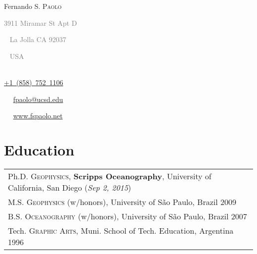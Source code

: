 \documentclass[a4paper,11pt]{article}
\newcommand*{\tbullet}{~\strut\textcolor{grey}{\LARGE\textbullet}~~}
\newcommand*{\tdash}{\strut\textcolor{grey}{\textemdash}~}
\begin{document}
\pagestyle{empty} 



\begin{center}
{\Huge 
Fernando S. \textsc{Paolo}
}\\[0.2cm]
%
\textcolor{grey}{
3911 Miramar St Apt D \tdash 
La Jolla CA 92037 \tdash
USA
}\\[0.01cm]
%
\href{}{+1~(858)~752~1106} \tbullet 
\href{mailto:fpaolo@ucsd.edu}{fpaolo@ucsd.edu} \tbullet 
\href{http://fspaolo.net}{www.fspaolo.net}
\end{center}
\vspace*{0.7cm}

%


\section{Education}

\begin{tabular}{l}
Ph.D. \textsc{Geophysics}, \textbf{Scripps Oceanography}, University
    of California, San Diego (\emph{Sep 2, 2015})\\
M.S. \textsc{Geophysics} (w/honors), University of S\~ao Paulo, Brazil 2009\\
B.S. \textsc{Oceanography} (w/honors), University of S\~ao Paulo, Brazil 2007\\
Tech. \textsc{Graphic Arts}, Muni. School of Tech. Education, Argentina 1996\\
\end{tabular}
\end{document}
